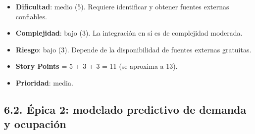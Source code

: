 \documentclass[
11pt, %
]{charter}
\begin{document}
\begin{itemize}
    \begin{itemize}
      \item \textbf{Dificultad}: medio (5). Requiere identificar y obtener fuentes externas confiables.
      \item \textbf{Complejidad}: bajo (3). La integración en sí es de complejidad moderada.
      \item \textbf{Riesgo}: bajo (3). Depende de la disponibilidad de fuentes externas gratuitas.
      \item \textbf{Story Points} = 5 + 3 + 3 = 11 (se aproxima a 13).
      \item \textbf{Prioridad}: media.
    \end{itemize}
\end{itemize}

\subsection*{6.2. Épica 2: modelado predictivo de demanda y ocupación}
\end{document}
